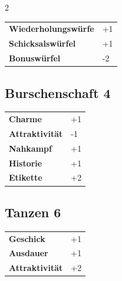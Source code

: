 \begin{multicols}{2}
\begin{tcolorbox}
\begin{tabular}{@{}ll@{}}
    \textbf{Wiederholungswürfe} & +1\\
    \textbf{Schicksalswürfel} & +1\\
    \textbf{Bonuswürfel} & -2\\
\end{tabular}


\end{tcolorbox}

\begin{tcolorbox}
    \subsection*{Burschenschaft \hfill \small{4 }}
    \tcblower




\begin{tabular}{@{}ll@{}}
    \textbf{Charme} & +1\\
    \textbf{Attraktivität} & -1\\
    \textbf{Nahkampf} & +1\\
    \textbf{Historie} & +1\\
    \textbf{Etikette} & +2\\
\end{tabular}


\end{tcolorbox}

\begin{tcolorbox}
    \subsection*{Tanzen \hfill \small{6 }}
    \tcblower




\begin{tabular}{@{}ll@{}}
    \textbf{Geschick} & +1\\
    \textbf{Ausdauer} & +1\\
    \textbf{Attraktivität} & +2\\
\end{tabular}


\end{tcolorbox}
\end{multicols}
